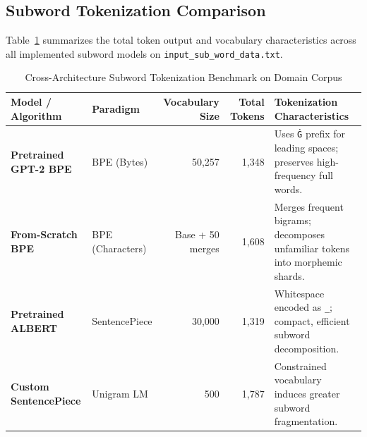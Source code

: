 \documentclass[12pt,a4paper]{report}
\begin{document}
\subsection{Subword Tokenization Comparison}
Table~\ref{tab:exp5_subword_summary} summarizes the total token output and vocabulary characteristics across all implemented subword models on \texttt{input\_sub\_word\_data.txt}.
\begin{table}[H]
\centering
\small
\caption{Cross-Architecture Subword Tokenization Benchmark on Domain Corpus}
\label{tab:exp5_subword_summary}
\begin{tabularx}{\textwidth}{llrrX}
\toprule
\textbf{Model / Algorithm} & \textbf{Paradigm} & \textbf{Vocabulary Size} & \textbf{Total Tokens} & \textbf{Tokenization Characteristics} \\
\midrule
\textbf{Pretrained GPT-2 BPE} & BPE (Bytes) & 50,257 & 1,348 & Uses \texttt{Ġ} prefix for leading spaces; preserves high-frequency full words. \\
\textbf{From-Scratch BPE} & BPE (Characters) & Base + 50 merges & 1,608 & Merges frequent bigrams; decomposes unfamiliar tokens into morphemic shards. \\
\textbf{Pretrained ALBERT} & SentencePiece & 30,000 & 1,319 & Whitespace encoded as \texttt{\_}; compact, efficient subword decomposition. \\
\textbf{Custom SentencePiece} & Unigram LM & 500 & 1,787 & Constrained vocabulary induces greater subword fragmentation. \\
\bottomrule
\end{tabularx}
\end{table}
\end{document}
